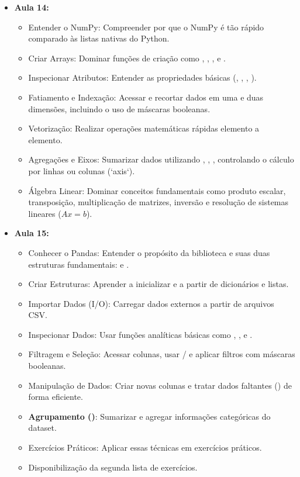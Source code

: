 \begin{itemize}
    \item \textbf{Aula 14:}
    \begin{itemize}\justifying
        \item Entender o NumPy: Compreender por que o NumPy é tão rápido comparado às listas nativas do Python.
        \item Criar Arrays: Dominar funções de criação como , , ,  e .
        \item Inspecionar Atributos: Entender as propriedades básicas (, , , ).
        \item Fatiamento e Indexação: Acessar e recortar dados em uma e duas dimensões, incluindo o uso de máscaras booleanas.
        \item Vetorização: Realizar operações matemáticas rápidas elemento a elemento.
        \item Agregações e Eixos: Sumarizar dados utilizando , , , controlando o cálculo por linhas ou colunas (`axis`).
        \item Álgebra Linear: Dominar conceitos fundamentais como produto escalar, transposição, multiplicação de matrizes, inversão e resolução de sistemas lineares ($Ax = b$).

    \end{itemize}

    \item \textbf{Aula 15:}
    \begin{itemize}\justifying
        \item Conhecer o Pandas: Entender o propósito da biblioteca e suas duas estruturas fundamentais:  e .
        \item Criar Estruturas: Aprender a inicializar  e  a partir de dicionários e listas.
        \item Importar Dados (I/O): Carregar dados externos a partir de arquivos CSV.
        \item Inspecionar Dados: Usar funções analíticas básicas como , ,  e .
        \item Filtragem e Seleção: Acessar colunas, usar  /  e aplicar filtros com máscaras booleanas.
        \item Manipulação de Dados: Criar novas colunas e tratar dados faltantes () de forma eficiente.
        \item \textbf{Agrupamento ()}: Sumarizar e agregar informações categóricas do dataset.
        \item Exercícios Práticos: Aplicar essas técnicas em exercícios práticos.
        \item Disponibilização da segunda lista de exercícios.
    \end{itemize}


\end{itemize}

